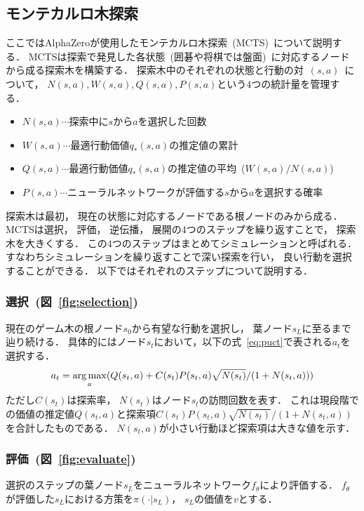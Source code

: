\subsection{モンテカルロ木探索}
ここではAlphaZeroが使用したモンテカルロ木探索~(MCTS)~について説明する．
MCTSは探索で発見した各状態~(囲碁や将棋では盤面)~に対応するノードから成る探索木を構築する．
探索木中のそれぞれの状態と行動の対~$(s,a)$~について， ${N(s,a), W(s,a), Q(s,a), P(s,a)}$という$4$つの統計量を管理する．
\begin{itemize}
  \item $N(s,a) \cdots$探索中に$s$から$a$を選択した回数
  \item $W(s,a) \cdots$最適行動価値$q_*(s,a)$の推定値の累計
  \item $Q(s,a) \cdots$最適行動価値$q_*(s,a)$の推定値の平均~($W(s,a) / N(s,a)$)
  \item $P(s,a) \cdots$ニューラルネットワークが評価する$s$から$a$を選択する確率
\end{itemize}
探索木は最初， 現在の状態に対応するノードである根ノードのみから成る．
MCTSは選択， 評価， 逆伝播， 展開の$4$つのステップを繰り返すことで， 探索木を大きくする．
この$4$つのステップはまとめてシミュレーションと呼ばれる．
すなわちシミュレーションを繰り返すことで深い探索を行い， 良い行動を選択することができる．
以下ではそれぞれのステップについて説明する．
\subsubsection*{選択~(図~\ref{fig:selection})}
現在のゲーム木の根ノード$s_0$から有望な行動を選択し， 葉ノード$s_L$に至るまで辿り続ける．
具体的にはノード$s_t$において，以下の式~\ref{eq:puct}で表される$a_t$を選択する．
\begin{align}
  a_t = \operatorname*{arg\,max}_a(Q(s_t,a) + C(s_t)P(s_t,a)\sqrt{N(s_t)}/(1 + N(s_t,a)))
  \label{eq:puct}
\end{align}
ただし$C(s_t)$は探索率， $N(s_t)$はノード$s_t$の訪問回数を表す．
これは現段階での価値の推定値$Q(s_t,a)$と探索項$C(s_t)P(s_t,a)\sqrt{N(s_t)}/(1 + N(s_t,a))$を合計したものである．
$N(s_t,a)$が小さい行動ほど探索項は大きな値を示す．

\subsubsection*{評価~(図~\ref{fig:evaluate})}
選択のステップの葉ノード$s_L$をニューラルネットワーク$f_\theta$により評価する．
$f_\theta$が評価した$s_L$における方策を$\pi(\cdot|s_L)$， $s_L$の価値を$v$とする．

